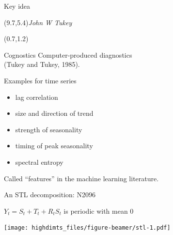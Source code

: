 \documentclass[14pt,ignorenonframetext,]{beamer}
\providecommand{\tightlist}{%
  \setlength{\itemsep}{0pt}\setlength{\parskip}{0pt}}
\begin{document}
\begin{frame}{Key idea}
\protect\hypertarget{key-idea}{}

\begin{textblock}{3}(9.7,5.4)\small\textit{John W Tukey}\end{textblock}
\begin{textblock}{8}(0.7,1.2)
\begin{alertblock}{Cognostics}
Computer-produced diagnostics\\ (Tukey and Tukey, 1985).
\end{alertblock}
\end{textblock}\pause
\vspace*{2.5cm}

\alert{Examples for time series}

\begin{itemize}
\tightlist
\item
  lag correlation
\item
  size and direction of trend
\item
  strength of seasonality
\item
  timing of peak seasonality
\item
  spectral entropy
\end{itemize}

\vspace*{0.3cm}
\begin{block}{}
Called ``features'' in the machine learning literature.
\end{block}

\end{frame}

\begin{frame}{An STL decomposition: N2096}
\protect\hypertarget{an-stl-decomposition-n2096}{}

\begin{alertblock}{}
\centerline{$Y_t = S_t + T_t + R_t$\qquad $S_{t}$ is periodic with mean 0}
\end{alertblock}

\texttt{[image: highdimts\_files/figure-beamer/stl-1.pdf]}

\end{frame}
\end{document}
